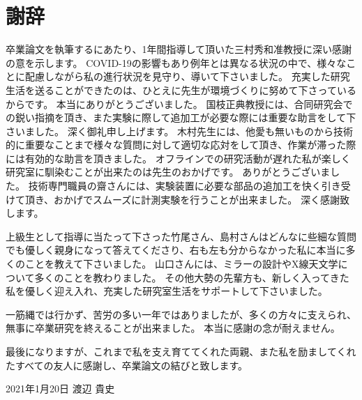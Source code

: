 \chapter*{謝辞}

卒業論文を執筆するにあたり、1年間指導して頂いた三村秀和准教授に深い感謝の意を示します。
COVID-19の影響もあり例年とは異なる状況の中で、様々なことに配慮しながら私の進行状況を見守り、導いて下さいました。
充実した研究生活を送ることができたのは、ひとえに先生が環境づくりに努めて下さっているからです。
本当にありがとうございました。
国枝正典教授には、合同研究会での鋭い指摘を頂き、また実験に際して追加工が必要な際には重要な助言をして下さいました。
深く御礼申し上げます。
木村先生には、他愛も無いものから技術的に重要なことまで様々な質問に対して適切な応対をして頂き、作業が滞った際には有効的な助言を頂きました。
オフラインでの研究活動が遅れた私が楽しく研究室に馴染むことが出来たのは先生のおかげです。
ありがとうございました。
技術専門職員の齋さんには、実験装置に必要な部品の追加工を快く引き受けて頂き、おかげでスムーズに計測実験を行うことが出来ました。
深く感謝致します。

上級生として指導に当たって下さった竹尾さん、島村さんはどんなに些細な質問でも優しく親身になって答えてくださり、右も左も分からなかった私に本当に多くのことを教えて下さいました。
山口さんには、ミラーの設計やX線天文学について多くのことを教わりました。
その他大勢の先輩方も、新しく入ってきた私を優しく迎え入れ、充実した研究室生活をサポートして下さいました。

一筋縄では行かず、苦労の多い一年ではありましたが、多くの方々に支えられ、無事に卒業研究を終えることが出来ました。
本当に感謝の念が耐えません。

最後になりますが、これまで私を支え育ててくれた両親、また私を励ましてくれたすべての友人に感謝し、卒業論文の結びと致します。

\label{thankyou}

\lhead[謝辞]{}
\thispagestyle{empty}

\newpage

\begin{flushright}
2021年1月20日 渡辺 貴史
\end{flushright}


